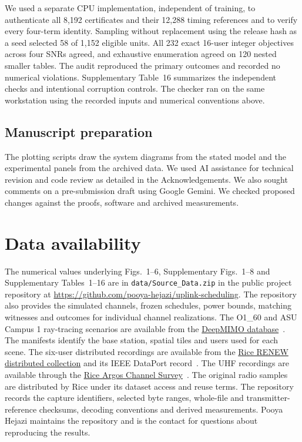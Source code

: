 \documentclass[11pt,letterpaper]{article}
\begin{document}
We used a separate CPU implementation, independent of training, to authenticate all 8,192 certificates and their 12,288 timing references and to verify every four-term identity. Sampling without replacement using the release hash as a seed selected 58 of 1,152 eligible units. All 232 exact 16-user integer objectives across four SNRs agreed, and exhaustive enumeration agreed on 120 nested smaller tables. The audit reproduced the primary outcomes and recorded no numerical violations. Supplementary Table~16 summarizes the independent checks and intentional corruption controls. The checker ran on the same workstation using the recorded inputs and numerical conventions above.

\subsection*{Manuscript preparation}
The plotting scripts draw the system diagrams from the stated model and the experimental panels from the archived data. We used AI assistance for technical revision and code review as detailed in the Acknowledgements. We also sought comments on a pre-submission draft using Google Gemini. We checked proposed changes against the proofs, software and archived measurements.

\section*{Data availability}
The numerical values underlying Figs.~1--6, Supplementary Figs.~1--8 and Supplementary Tables~1--16 are in \nolinkurl{data/Source_Data.zip} in the public project repository at \url{https://github.com/pooya-hejazi/uplink-scheduling}. The repository also provides the simulated channels, frozen schedules, power bounds, matching witnesses and outcomes for individual channel realizations. The O1\_60 and ASU Campus 1 ray-tracing scenarios are available from the \href{https://www.deepmimo.net/}{DeepMIMO database}~\cite{deepmimo}. The manifests identify the base station, spatial tiles and users used for each scene. The six-user distributed recordings are available from the \href{https://renew.rice.edu/dataset-distributed.html}{Rice RENEW distributed collection} and its IEEE DataPort record~\cite{zafari}. The UHF recordings are available through the \href{https://renew.rice.edu/dataset-argos.html}{Rice Argos Channel Survey}~\cite{shepard}. The original radio samples are distributed by Rice under its dataset access and reuse terms. The repository records the capture identifiers, selected byte ranges, whole-file and transmitter-reference checksums, decoding conventions and derived measurements.
Pooya Hejazi maintains the repository and is the contact for questions about reproducing the results.
\end{document}
